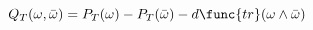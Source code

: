\begin{equation}
Q_{T}(\omega ,\bar{\omega})=P_{T}(\omega )-P_{T}(\bar{\omega})-d\func{tr}%
(\omega \wedge \bar{\omega})  \label{eqn:QT}
\end{equation}

